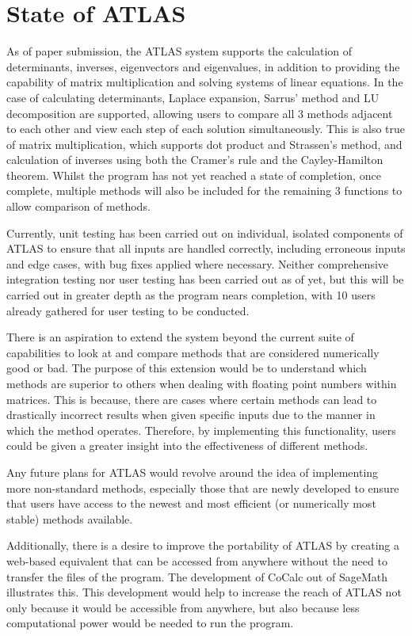 \documentclass[
]{ceurart}
\begin{document}
\section{State of ATLAS}
As of paper submission, the ATLAS system supports the calculation of determinants, inverses, eigenvectors and eigenvalues, in addition to providing the capability of matrix multiplication and solving systems of linear equations. In the case of calculating determinants, Laplace expansion, Sarrus' method and LU decomposition are supported, allowing users to compare all 3 methods adjacent to each other and view each step of each solution simultaneously. This is also true of matrix multiplication, which supports dot product and Strassen's method, and calculation of inverses using both the Cramer's rule and the Cayley-Hamilton theorem. Whilst the program has not yet reached a state of completion, once complete, multiple methods will also be included for the remaining 3 functions to allow comparison of methods.

Currently, unit testing has been carried out on individual, isolated components of ATLAS to ensure that all inputs are handled correctly, including erroneous inputs and edge cases, with bug fixes applied where necessary. Neither comprehensive integration testing nor user testing has been carried out as of yet, but this will be carried out in greater depth as the program nears completion, with 10 users already gathered for user testing to be conducted.

There is an aspiration to extend the system beyond the current suite of capabilities to look at and compare methods that are considered numerically good or bad. The purpose of this extension would be to understand which methods are superior to others when dealing with floating point numbers within matrices. This is because, there are cases where certain methods can lead to drastically incorrect results when given specific inputs due to the manner in which the method operates. Therefore, by implementing this functionality, users could be given a greater insight into the effectiveness of different methods.

Any future plans for ATLAS would revolve around the idea of implementing more non-standard methods, especially those that are newly developed to ensure that users have access to the newest and most efficient (or numerically most stable) methods available. 

Additionally, there is a desire to improve the portability of ATLAS by creating a web-based equivalent that can be accessed from anywhere without the need to transfer the files of the program. The development of CoCalc out of SageMath illustrates this. This development would help to increase the reach of ATLAS not only because it would be accessible from anywhere, but also because less computational power would be needed to run the program. 
\end{document}
